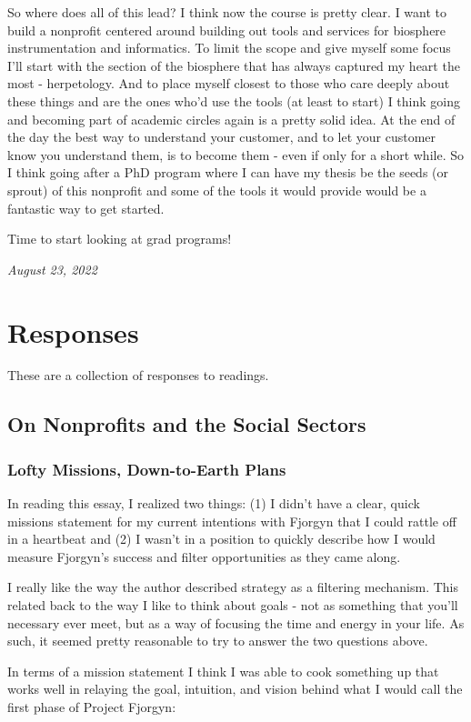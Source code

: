 \documentclass[10pt,a5paper]{book}
\begin{document}
So where does all of this lead? I think now the course is pretty clear. I want to build a nonprofit centered around building out tools and services for biosphere instrumentation and informatics. To limit the scope and give myself some focus I'll start with the section of the biosphere that has always captured my heart the most - herpetology. And to place myself closest to those who care deeply about these things and are the ones who'd use the tools (at least to start) I think going and becoming part of academic circles again is a pretty solid idea. At the end of the day the best way to understand your customer, and to let your customer know you understand them, is to become them - even if only for a short while. So I think going after a PhD program where I can have my thesis be the seeds (or sprout) of this nonprofit and some of the tools it would provide would be a fantastic way to get started. 

Time to start looking at grad programs!

\textit{August 23, 2022}

\chapter{Responses}
These are a collection of responses to readings.

\section{On Nonprofits and the Social Sectors}
\subsection{Lofty Missions, Down-to-Earth Plans}
In reading this essay, I realized two things: (1) I didn't have a clear, quick missions statement for my current intentions with Fjorgyn that I could rattle off in a heartbeat and (2) I wasn't in a position to quickly describe how I would measure Fjorgyn's success and filter opportunities as they came along. 

I really like the way the author described strategy as a filtering mechanism. This related back to the way I like to think about goals - not as something that you'll necessary ever meet, but as a way of focusing the time and energy in your life. As such, it seemed pretty reasonable to try to answer the two questions above. 

In terms of a mission statement I think I was able to cook something up that works well in relaying the goal, intuition, and vision behind what I would call the first phase of Project Fjorgyn:\linebreak
\end{document}
